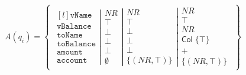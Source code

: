 \begin{align}
    A(q_i)=\left\{\begin{matrix}
                      \left.\begin{matrix*}[l]
                                \texttt{vName}\\
                                \texttt{vBalance}\\
                                \texttt{toName}\\
                                \texttt{toBalance}\\
                                \texttt{amount}\\
                                \texttt{account}
                      \end{matrix*}\right|
                      \left.\begin{matrix}
                                NR\\
                                \top\\
                                \bot\\
                                \bot\\
                                \bot\\
                                \emptyset
                      \end{matrix}\right|
                      \left.\begin{matrix}
                                NR\\
                                \top\\
                                \bot\\
                                \bot\\
                                \bot\\
                                \{(NR,\top)\}
                      \end{matrix}\right|
                      \begin{matrix}
                          NR\\
                          \top\\
                          NR\\
                          \mathsf{Col} \; \{\top\}\\
                          +\\
                          \{(NR,\top)\}
                      \end{matrix}
    \end{matrix}\right\}
\end{align}

